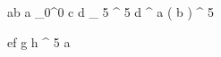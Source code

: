 \begin{eqcode}{a}{b}{}{}
  a \gets {}_0^0 \lend
  c \gets d _ 5 ^ 5 \lend
  d \gets \genar \limits ^ { a } ( b ) ^ 5 \lend
\end{eqcode}


\begin{eqcode}{e}{f}{}{}
  g \gets h ^ 5 \lend
  a  \lend
\end{eqcode}
